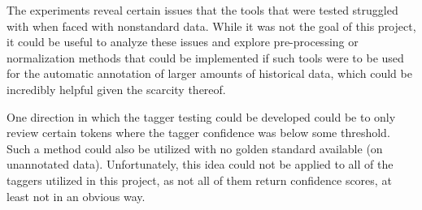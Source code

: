 The experiments reveal certain issues that the tools that were tested struggled with when faced with nonstandard data. While it was not the goal of this project, it could be useful to analyze these issues and explore pre-processing or normalization methods that could be implemented if such tools were to be used for the automatic annotation of larger amounts of historical data, which could be incredibly helpful given the scarcity thereof. 

One direction in which the tagger testing could be developed could be to only review certain tokens where the tagger confidence was below some threshold. Such a method could also be utilized with no golden standard available (on unannotated data). Unfortunately, this idea could not be applied to all of the taggers utilized in this project, as not all of them return confidence scores, at least not in an obvious way.